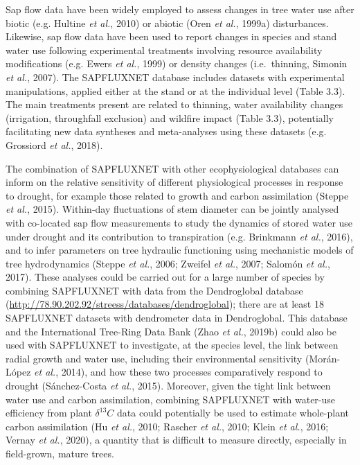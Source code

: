 \documentclass[11pt,twoside]{reedthesis}
\begin{document}
Sap flow data have been widely employed to assess changes in tree water
use after biotic (e.g. Hultine \emph{et al.}, 2010) or abiotic (Oren
\emph{et al.}, 1999a) disturbances. Likewise, sap flow data have been
used to report changes in species and stand water use following
experimental treatments involving resource availability modifications
(e.g. Ewers \emph{et al.}, 1999) or density changes (i.e.~thinning,
Simonin \emph{et al.}, 2007). The SAPFLUXNET database includes datasets
with experimental manipulations, applied either at the stand or at the
individual level (Table 3.3). The main treatments present are related to
thinning, water availability changes (irrigation, throughfall exclusion)
and wildfire impact (Table 3.3), potentially facilitating new data
syntheses and meta-analyses using these datasets (e.g. Grossiord
\emph{et al.}, 2018).\par

The combination of SAPFLUXNET with other ecophysiological databases can
inform on the relative sensitivity of different physiological processes
in response to drought, for example those related to growth and carbon
assimilation (Steppe \emph{et al.}, 2015). Within-day fluctuations of
stem diameter can be jointly analysed with co-located sap flow
measurements to study the dynamics of stored water use under drought and
its contribution to transpiration (e.g. Brinkmann \emph{et al.}, 2016),
and to infer parameters on tree hydraulic functioning using mechanistic
models of tree hydrodynamics (Steppe \emph{et al.}, 2006; Zweifel
\emph{et al.}, 2007; Salomón \emph{et al.}, 2017). These analyses could
be carried out for a large number of species by combining SAPFLUXNET
with data from the Dendroglobal database
(\url{http://78.90.202.92/streess/databases/dendroglobal}); there are at
least 18 SAPFLUXNET datasets with dendrometer data in Dendroglobal. This
database and the International Tree-Ring Data Bank (Zhao \emph{et al.},
2019b) could also be used with SAPFLUXNET to investigate, at the species
level, the link between radial growth and water use, including their
environmental sensitivity (Morán-López \emph{et al.}, 2014), and how
these two processes comparatively respond to drought (Sánchez-Costa
\emph{et al.}, 2015). Moreover, given the tight link between water use
and carbon assimilation, combining SAPFLUXNET with water-use efficiency
from plant \(\delta^{13}C\) data could potentially be used to estimate
whole-plant carbon assimilation (Hu \emph{et al.}, 2010; Rascher
\emph{et al.}, 2010; Klein \emph{et al.}, 2016; Vernay \emph{et al.},
2020), a quantity that is difficult to measure directly, especially in
field-grown, mature trees.\par
\end{document}
